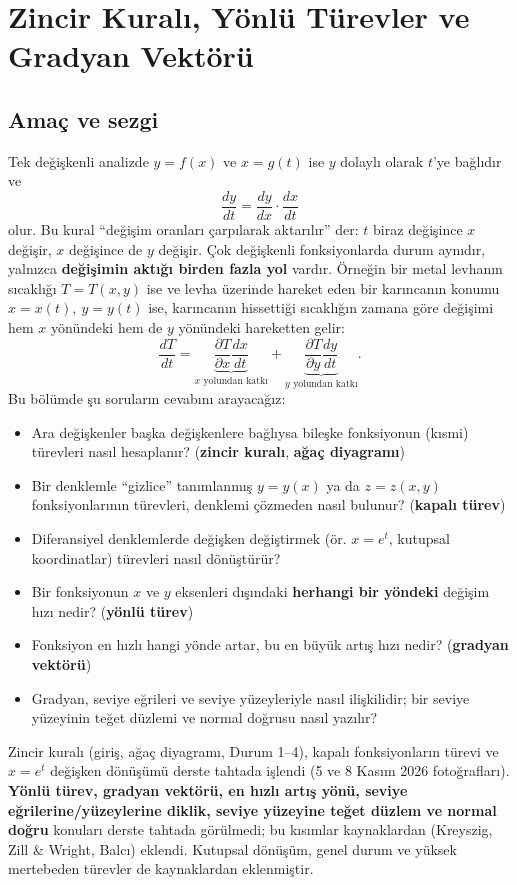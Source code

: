 \section{Zincir Kuralı, Yönlü Türevler ve Gradyan Vektörü}

\subsection{Amaç ve sezgi}

Tek değişkenli analizde $y=f(x)$ ve $x=g(t)$ ise $y$ dolaylı olarak $t$'ye bağlıdır ve
\[
\frac{dy}{dt}=\frac{dy}{dx}\cdot\frac{dx}{dt}
\]
olur. Bu kural ``değişim oranları çarpılarak aktarılır'' der: $t$ biraz değişince $x$ değişir, $x$ değişince de $y$
değişir. Çok değişkenli fonksiyonlarda durum aynıdır, yalnızca \textbf{değişimin aktığı birden fazla yol} vardır. Örneğin bir
metal levhanın sıcaklığı $T=T(x,y)$ ise ve levha üzerinde hareket eden bir karıncanın konumu $x=x(t),\ y=y(t)$ ise,
karıncanın hissettiği sıcaklığın zamana göre değişimi hem $x$ yönündeki hem de $y$ yönündeki hareketten gelir:
\[
\frac{dT}{dt}=\underbrace{\frac{\partial T}{\partial x}\frac{dx}{dt}}_{x\text{ yolundan katkı}}
+\underbrace{\frac{\partial T}{\partial y}\frac{dy}{dt}}_{y\text{ yolundan katkı}} .
\]
Bu bölümde şu soruların cevabını arayacağız:
\begin{itemize}
  \item Ara değişkenler başka değişkenlere bağlıysa bileşke fonksiyonun (kısmi) türevleri nasıl hesaplanır? (\textbf{zincir kuralı}, \textbf{ağaç diyagramı})
  \item Bir denklemle ``gizlice'' tanımlanmış $y=y(x)$ ya da $z=z(x,y)$ fonksiyonlarının türevleri, denklemi çözmeden nasıl bulunur? (\textbf{kapalı türev})
  \item Diferansiyel denklemlerde değişken değiştirmek (ör. $x=e^t$, kutupsal koordinatlar) türevleri nasıl dönüştürür?
  \item Bir fonksiyonun $x$ ve $y$ eksenleri dışındaki \textbf{herhangi bir yöndeki} değişim hızı nedir? (\textbf{yönlü türev})
  \item Fonksiyon en hızlı hangi yönde artar, bu en büyük artış hızı nedir? (\textbf{gradyan vektörü})
  \item Gradyan, seviye eğrileri ve seviye yüzeyleriyle nasıl ilişkilidir; bir seviye yüzeyinin teğet düzlemi ve normal doğrusu nasıl yazılır?
\end{itemize}

\begin{bilgi}
Zincir kuralı (giriş, ağaç diyagramı, Durum 1--4), kapalı fonksiyonların türevi ve $x=e^t$ değişken dönüşümü derste
tahtada işlendi (5 ve 8 Kasım 2026 fotoğrafları). \textbf{Yönlü türev, gradyan vektörü, en hızlı artış yönü, seviye
eğrilerine/yüzeylerine diklik, seviye yüzeyine teğet düzlem ve normal doğru} konuları derste tahtada görülmedi;
bu kısımlar kaynaklardan (Kreyszig, Zill \& Wright, Balcı) eklendi. Kutupsal dönüşüm, genel durum ve yüksek
mertebeden türevler de kaynaklardan eklenmiştir.
\end{bilgi}

